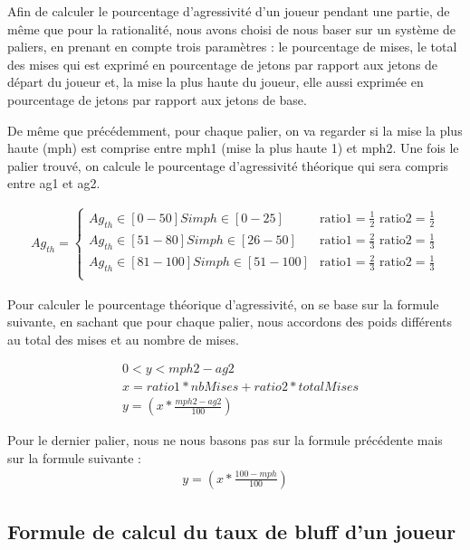 \documentclass{report}
\begin{document}
Afin de calculer le pourcentage d'agressivité d'un joueur pendant une partie, de même que pour la rationalité, nous avons choisi de nous baser sur un système de paliers, en prenant en compte trois paramètres : le pourcentage de mises, le total des mises qui est exprimé en pourcentage de jetons par rapport aux jetons de départ du joueur et, la mise la plus haute du joueur, elle aussi exprimée en pourcentage de jetons par rapport aux jetons de base.\par
De même que précédemment, pour chaque palier, on va regarder si la mise la plus haute (mph) est comprise entre mph1 (mise la plus haute 1) et mph2. Une fois le palier trouvé, on calcule le pourcentage d'agressivité théorique qui sera compris entre ag1 et ag2. 


\small{
\begin{align*}
	Ag_{th}=
	\begin{cases}
		Ag_{th} \in [0-50] Si mph \in [0-25] &\text{ratio1}=\frac{1}{2} \text{ ratio2}=\frac{1}{2} \\
		Ag_{th} \in [51-80] Si mph \in [26-50] &\text{ratio1}=\frac{2}{3} \text{ ratio2}=\frac{1}{3} \\
		Ag_{th} \in [81-100] Si mph \in [51-100]  &\text{ratio1}=\frac{2}{3} \text{ ratio2}=\frac{1}{3}\\
	\end{cases}
\end{align*}

}

Pour calculer le pourcentage théorique d'agressivité, on se base sur la formule suivante, en sachant que pour chaque palier, nous accordons des poids différents au total des mises et au nombre de mises.

\begin{align*}
	&0<y<mph2-ag2\\
	&x=ratio1 * nbMises + ratio2 * totalMises\\
	&y=\left(x*\frac{mph2-ag2}{100}\right)
\end{align*}

Pour le dernier palier, nous ne nous basons pas sur la formule précédente mais sur la formule suivante :\\

\begin{align*}
	y=\left(x*\frac{100-mph}{100}\right)
\end{align*}

\subsection{Formule de calcul du taux de bluff d'un joueur}
\end{document}
